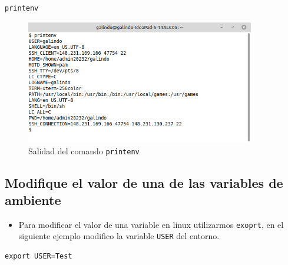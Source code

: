 \documentclass[11pt]{article}
\begin{document}
\begin{verbatim}
printenv
\end{verbatim}

\begin{figure}[htbp]
\centering
\includegraphics[width=10cm]{img/2.png}
\caption[\texttt{printenv}]{Salidad del comando \texttt{printenv}}
\end{figure}

\subsection{Modifique el valor de una de las variables de ambiente}
\label{sec:org5961707}
\begin{itemize}
\item \autocite{Rainville_2020} Para modificar el valor de una variable en linux utilizarmos \texttt{exoprt}, en el siguiente ejemplo modifico la variable \texttt{USER} del entorno.
\end{itemize}

\begin{verbatim}
export USER=Test
\end{verbatim}
\end{document}

